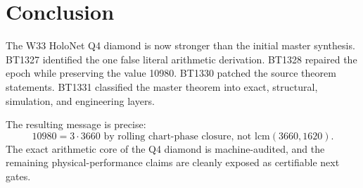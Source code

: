 \documentclass[11pt]{article}
\begin{document}
\section{Conclusion}

The W33 HoloNet Q4 diamond is now stronger than the initial master synthesis.  BT1327 identified the one false literal arithmetic derivation.  BT1328 repaired the epoch while preserving the value 10980.  BT1330 patched the source theorem statements.  BT1331 classified the master theorem into exact, structural, simulation, and engineering layers.

The resulting message is precise:
\[
\boxed{10980=3\cdot3660\text{ by rolling chart-phase closure, not }\mathrm{lcm}(3660,1620).}
\]
The exact arithmetic core of the Q4 diamond is machine-audited, and the remaining physical-performance claims are cleanly exposed as certifiable next gates.
\end{document}
